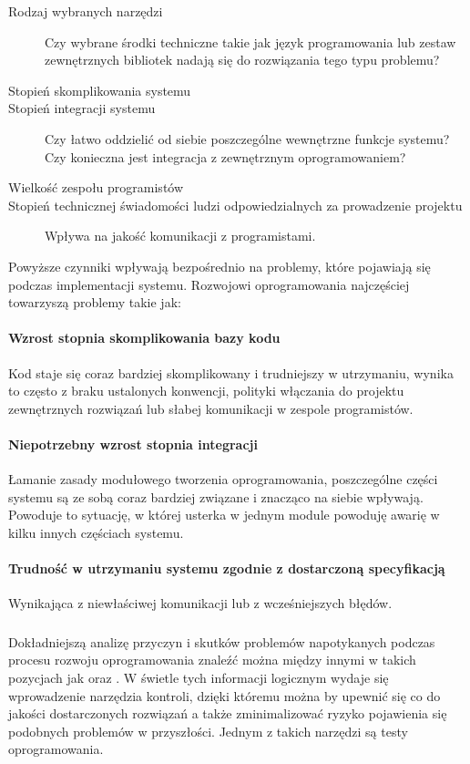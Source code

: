 	  \begin{description}
	    \item[Rodzaj wybranych narzędzi] Czy wybrane środki techniczne takie jak język programowania lub zestaw zewnętrznych bibliotek nadają się do rozwiązania tego typu problemu?
	    \item[Stopień skomplikowania systemu]
	    \item[Stopień integracji systemu] Czy łatwo oddzielić od siebie poszczególne wewnętrzne funkcje systemu? Czy konieczna jest integracja z zewnętrznym oprogramowaniem?
	    \item[Wielkość zespołu programistów]
	    \item[Stopień technicznej świadomości ludzi odpowiedzialnych za prowadzenie projektu] Wpływa na jakość komunikacji z programistami.
	  \end{description}
	  
	  Powyższe czynniki wpływają bezpośrednio na problemy, które pojawiają się podczas implementacji systemu. Rozwojowi oprogramowania najczęściej towarzyszą problemy takie jak:
	  
	  \paragraph{Wzrost stopnia skomplikowania bazy kodu}
	    Kod staje się coraz bardziej skomplikowany i trudniejszy w utrzymaniu, wynika to często z braku ustalonych konwencji, polityki włączania do projektu zewnętrznych rozwiązań lub słabej komunikacji w zespole programistów.
	  \paragraph{Niepotrzebny wzrost stopnia integracji}
	    Łamanie zasady modułowego tworzenia oprogramowania, poszczególne części systemu są ze sobą coraz bardziej związane i znacząco na siebie wpływają. Powoduje to sytuację, w której usterka w jednym module powoduję awarię w kilku innych częściach systemu.
	  \paragraph{Trudność w utrzymaniu systemu zgodnie z dostarczoną specyfikacją}
	    Wynikająca z niewłaściwej komunikacji lub z wcześniejszych błędów.
	
	\subsubsection{}
	Dokładniejszą analizę przyczyn i skutków problemów napotykanych podczas procesu rozwoju oprogramowania znaleźć można między innymi w takich pozycjach jak \cite{pragmatic_programmer} oraz \cite{rspec_book}.  W świetle tych informacji logicznym wydaje się wprowadzenie narzędzia kontroli, dzięki któremu można by upewnić się co do jakości dostarczonych rozwiązań a także zminimalizować ryzyko pojawienia się podobnych problemów w przyszłości. Jednym z takich narzędzi są testy oprogramowania.
	  
